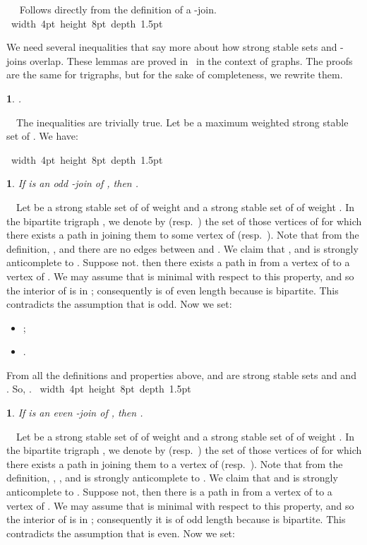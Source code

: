 \documentclass[11 pt] {article}
\newcommand\blackslug{\hbox{\hskip 1pt \vrule width 4pt height 8pt depth 1.5pt
        \hskip 1pt}}
\newcommand\bbox{\hfill \quad \blackslug \medbreak}
\newtheorem{lemma}[theorem]{}
\newcounter{claim}
\newcommand{\Proof}{\setcounter{claim}{0}\noindent{\bf Proof.}\ \ }
\begin{document}
\Proof
  Follows directly from the definition of a -join.
\bbox

We need several inequalities that say more about how strong stable
sets and -joins overlap.  These lemmas are proved
in~\cite{nicolas.kristina:2-join} in the context of graphs.  The
proofs are the same for trigraphs, but for the sake of
completeness, we rewrite them.

\begin{lemma}
  \label{l:ineqbasic}
  .
\end{lemma}

\Proof The inequalities  are trivially true. Let  be a maximum
weighted strong stable set of .  We have:
  
\bbox

\begin{lemma}
  \label{l:ineqOdd}
  If  is an odd -join of , then .
\end{lemma}

\Proof Let  be a strong stable set of  of weight
 and  a strong stable set of  of weight .
In the bipartite trigraph , we denote by 
(resp.\ ) the set of those vertices of  for which there
exists a path in  joining them to some vertex of
 (resp.\ ).  Note that from the definition, ,  and there are no edges 
between  and .  We claim that
, and  is strongly anticomplete to . 
Suppose not. then there exists a  path   in  from a vertex of 
 to a vertex of .  We may assume that  is minimal 
with respect to this property, and so the  interior of  is in ; 
consequently  is of even length because  is bipartite.  
This contradicts the assumption that  is odd.  Now we set:

  \begin{itemize}
  \item ;
  \item .
  \end{itemize}

  From all the definitions and properties above,  and  are
  strong stable sets and  and .  So, .  \bbox


\begin{lemma}
  \label{l:ineqEven}
  If  is an even -join of , then
  .
\end{lemma}

\Proof Let  be a strong stable set of  of weight
 and  a strong stable set of  of
weight .  In the bipartite trigraph , we
denote by  (resp.\ ) the set of those vertices of 
for which there exists a path  in  joining them to
a vertex of  (resp.\ ).  Note that from the
definition, , ,
and  is strongly anticomplete to .  We claim that  and  is
strongly anticomplete to . Suppose not, then there is a path 
in  from a vertex of  to a vertex of .  We may assume that  is minimal with respect to this
property, and so the interior of  is in ; consequently it is
of odd length because  is bipartite.  This contradicts
the assumption that  is even.  Now we set:
\end{document}

